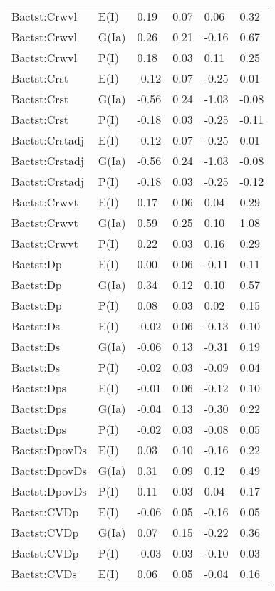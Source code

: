 \begin{center}
\begin{longtable}{|p{1.1in}|p{0.7in}|p{0.7in}|p{0.6in}|p{0.6in}|p{0.6in}|}
  Bactst:Crwvl & E(I) & 0.19 & 0.07 & 0.06 & 0.32 \\ 
  Bactst:Crwvl & G(Ia) & 0.26 & 0.21 & -0.16 & 0.67 \\ 
  Bactst:Crwvl & P(I) & 0.18 & 0.03 & 0.11 & 0.25 \\ 
  Bactst:Crst & E(I) & -0.12 & 0.07 & -0.25 & 0.01 \\ 
  Bactst:Crst & G(Ia) & -0.56 & 0.24 & -1.03 & -0.08 \\ 
  Bactst:Crst & P(I) & -0.18 & 0.03 & -0.25 & -0.11 \\ 
  Bactst:Crstadj & E(I) & -0.12 & 0.07 & -0.25 & 0.01 \\ 
  Bactst:Crstadj & G(Ia) & -0.56 & 0.24 & -1.03 & -0.08 \\ 
  Bactst:Crstadj & P(I) & -0.18 & 0.03 & -0.25 & -0.12 \\ 
  Bactst:Crwvt & E(I) & 0.17 & 0.06 & 0.04 & 0.29 \\ 
  Bactst:Crwvt & G(Ia) & 0.59 & 0.25 & 0.10 & 1.08 \\ 
  Bactst:Crwvt & P(I) & 0.22 & 0.03 & 0.16 & 0.29 \\ 
  Bactst:Dp & E(I) & 0.00 & 0.06 & -0.11 & 0.11 \\ 
  Bactst:Dp & G(Ia) & 0.34 & 0.12 & 0.10 & 0.57 \\ 
  Bactst:Dp & P(I) & 0.08 & 0.03 & 0.02 & 0.15 \\ 
  Bactst:Ds & E(I) & -0.02 & 0.06 & -0.13 & 0.10 \\ 
  Bactst:Ds & G(Ia) & -0.06 & 0.13 & -0.31 & 0.19 \\ 
  Bactst:Ds & P(I) & -0.02 & 0.03 & -0.09 & 0.04 \\ 
  Bactst:Dps & E(I) & -0.01 & 0.06 & -0.12 & 0.10 \\ 
  Bactst:Dps & G(Ia) & -0.04 & 0.13 & -0.30 & 0.22 \\ 
  Bactst:Dps & P(I) & -0.02 & 0.03 & -0.08 & 0.05 \\ 
  Bactst:DpovDs & E(I) & 0.03 & 0.10 & -0.16 & 0.22 \\ 
  Bactst:DpovDs & G(Ia) & 0.31 & 0.09 & 0.12 & 0.49 \\ 
  Bactst:DpovDs & P(I) & 0.11 & 0.03 & 0.04 & 0.17 \\ 
  Bactst:CVDp & E(I) & -0.06 & 0.05 & -0.16 & 0.05 \\ 
  Bactst:CVDp & G(Ia) & 0.07 & 0.15 & -0.22 & 0.36 \\ 
  Bactst:CVDp & P(I) & -0.03 & 0.03 & -0.10 & 0.03 \\ 
  Bactst:CVDs & E(I) & 0.06 & 0.05 & -0.04 & 0.16 \\ 

\end{longtable}
\end{center}
